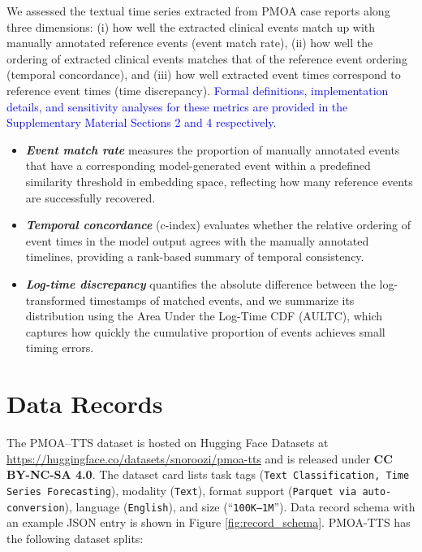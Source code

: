 \documentclass[pdflatex,sn-mathphys-num]{sn-jnl}%
\theoremstyle{thmstyleone}%
\theoremstyle{thmstyletwo}%
\theoremstyle{thmstylethree}%
\begin{document}
We assessed the textual time series extracted from PMOA case reports along three dimensions: (i) how well the extracted clinical events match up with manually annotated reference events (event match rate), (ii) how well the ordering of extracted clinical events matches that of the reference event ordering (temporal concordance), and (iii) how well extracted event times correspond to reference event times (time discrepancy). \textcolor{blue}{Formal definitions, implementation details, and sensitivity analyses for these metrics are provided in the Supplementary Material Sections 2 and 4 respectively.}

\begin{itemize}
    \item \textbf{\emph{Event match rate}} measures the proportion of manually annotated events that have a corresponding model-generated event within a predefined similarity threshold in embedding space, reflecting how many reference events are successfully recovered.
    \item \textbf{\emph{Temporal concordance}} (c-index) evaluates whether the relative ordering of event times in the model output agrees with the manually annotated timelines, providing a rank-based summary of temporal consistency.
    \item \textbf{\emph{Log-time discrepancy}} quantifies the absolute difference between the log-transformed timestamps of matched events, and we summarize its distribution using the Area Under the Log-Time CDF (AULTC), which captures how quickly the cumulative proportion of events achieves small timing errors.  
\end{itemize}




\section{Data Records}

The PMOA–TTS dataset is hosted on Hugging Face Datasets at \url{https://huggingface.co/datasets/snoroozi/pmoa-tts} and is released under \textbf{CC BY-NC-SA 4.0}. The dataset card lists task tags (\texttt{Text Classification, Time Series Forecasting}), modality (\texttt{Text}), format support (\texttt{Parquet via auto-conversion}), language (\texttt{English}), and size (“\texttt{100K–1M}”). Data record schema with an example JSON entry is shown in Figure \ref{fig:record_schema}. PMOA-TTS has the following dataset splits: 
\end{document}
